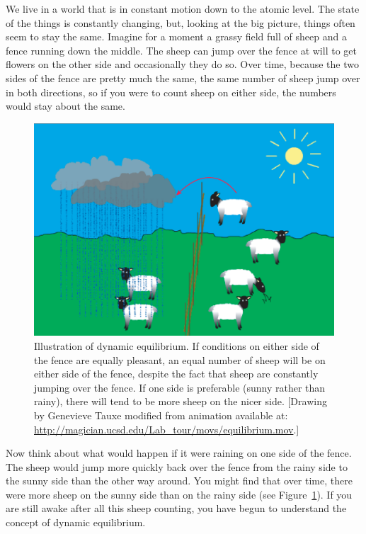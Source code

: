 We live in a world that is  in constant motion  down to the atomic level. The state of the things is constantly changing, but, looking at the big picture, things often seem to stay the same.  Imagine for a moment a grassy field full of sheep and  a fence running down the middle.  The sheep can jump over the fence at will to get flowers on the other side and occasionally they do so.   Over time, because the two sides of the fence  are pretty much the same, the same number of sheep jump over in both directions, so if you were to count sheep on either side, the numbers would stay about the same.



\begin{figure}[htb]
\centering  \includegraphics[width=10 cm]{EPSfiles/equilibrium.eps}
\caption{Illustration of dynamic equilibrium.  If conditions on either side of the fence are equally pleasant, an equal number of sheep will be on either side of the fence, despite the fact that sheep are constantly jumping over the fence.  If one side is preferable (sunny rather than rainy), there will tend to be more sheep on the nicer side.  [Drawing by Genevieve Tauxe modified from animation  available at: \newline \href{http://magician.ucsd.edu/Lab_tour/movs/equilibrium.mov}{http://magician.ucsd.edu/Lab_tour/movs/equilibrium.mov}.]}
\label{fig:equilibrium}
\end{figure}

Now think about what would happen if it were raining on one side of the fence.   The sheep would jump more quickly back over the fence from the rainy side to the sunny side than the other way around. You might find that over time, there were more sheep on the sunny side than on the rainy side (see Figure~\ref{fig:equilibrium}).   If you are still awake after all this sheep counting, you have begun to understand the concept of dynamic equilibrium.



